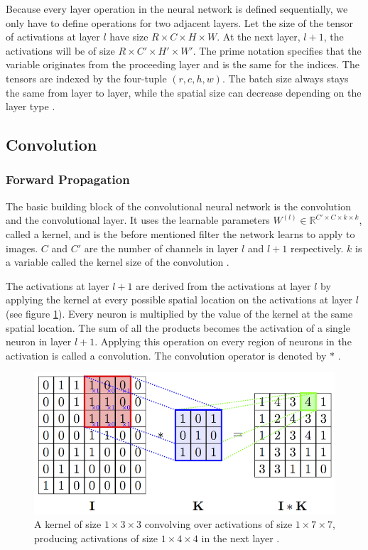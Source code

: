 \documentclass[a4paper, twoside]{article}
\begin{document}
Because every layer operation in the neural network is defined sequentially, we only have to define operations for two adjacent layers. Let the size of the tensor of activations at layer $l$ have size $R \times C \times H \times W$. At the next layer, $l+1$, the activations will be of size $R \times C' \times H' \times W'$. The prime notation specifies that the variable originates from the proceeding layer and is the same for the indices. The tensors are indexed by the four-tuple $(r, c, h, w)$. The batch size always stays the same from layer to layer, while the spatial size can decrease depending on the layer type \cite{cs231n} \cite{convmath}. 
\subsection{Convolution}
\subsubsection{Forward Propagation}
The basic building block of the convolutional neural network is the convolution and the convolutional layer. It uses the learnable parameters $W^{(l)} \in \mathbb{R}^{C' \times C  \times k \times k}$, called a kernel, and is the before mentioned filter the network learns to apply to images. $C$ and $C'$ are the number of channels in layer $l$ and $l+1$ respectively. $k$ is a variable called the kernel size of the convolution \cite{cs231n}. 

The activations at layer $l+1$ are derived from the activations at layer $l$ by applying the kernel at every possible spatial location on the activations at layer $l$ (see figure \ref{figkonv}). Every neuron is multiplied by the value of the kernel at the same spatial location. The sum of all the products becomes the activation of a single neuron in layer $l+1$. Applying this operation on every region of neurons in the activation is called a convolution. The convolution operator is denoted by $*$ \cite{cs231n} \cite{convmath} \cite{convarithmetic}. 

\begin{figure}[h]
	\centering
  		\includegraphics[scale=2.1]{convolution.png}
  	\caption{A kernel of size $1 \times 3 \times 3$ convolving over activations of size $1 \times 7 \times 7$, producing activations of size $1 \times 4 \times 4$ in the next layer \cite{figconv}. } \label{figkonv}
\end{figure}
\end{document}
